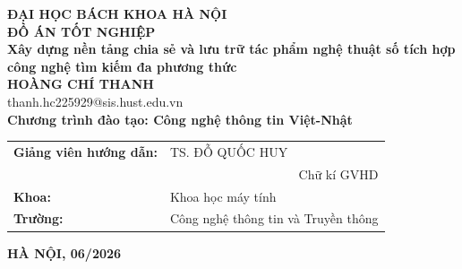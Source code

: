 \begin{titlepage}
\thispagestyle{empty}
\begin{center}
{\textbf{\large ĐẠI HỌC BÁCH KHOA HÀ NỘI}}\\[4cm]
{\textbf{\huge ĐỒ ÁN TỐT NGHIỆP}}\\[1.0cm]
{\textbf{\Large Xây dựng nền tảng chia sẻ và lưu trữ tác phẩm nghệ thuật số tích hợp công nghệ tìm kiếm đa phương thức}}\\[1.2cm]

{\textbf{\large HOÀNG CHÍ THANH}}\\[0.3cm]
{\large thanh.hc225929@sis.hust.edu.vn}\\[0.8cm]
{\textbf{\large{Chương trình đào tạo: Công nghệ thông tin Việt-Nhật}}}\\
\vspace{4cm}
\begin{table}[H]
\centering
\begin{tabular}{ll}
\textbf{Giảng viên hướng dẫn:} & TS. ĐỖ QUỐC HUY \hspace{0.5cm} \underline{\hspace{3cm}} \\[0.1cm]
                               & \multicolumn{1}{r}{Chữ kí GVHD} \\[0.5cm]
\textbf{Khoa:}                 & Khoa học máy tính \\[0.5cm]
\textbf{Trường:}               & Công nghệ thông tin và Truyền thông \\[0.5cm]
\end{tabular}
\end{table}

\vfill
{\textbf{HÀ NỘI, 06/2026}}
\end{center}
\end{titlepage}
